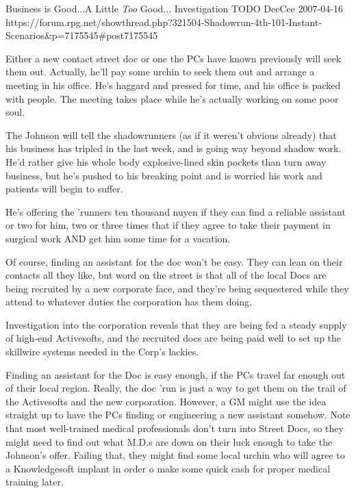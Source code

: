 \begin{scenario}{Business is Good...A Little \textit{Too} Good...}
	{Investigation}
	{TODO}
	{DeeCee}
	{2007-04-16}
	{https://forum.rpg.net/showthread.php?321504-Shadowrun-4th-101-Instant-Scenarios\&p=7175545#post7175545}

 Either a new contact street doc or one the PCs have known previously will seek them out. Actually, he'll pay some urchin to seek them out and arrange a meeting in his office. He's haggard and pressed for time, and his office is packed with people. The meeting takes place while he's actually working on some poor soul.

\synopsis The Johnson will tell the shadowrunners (as if it weren't obvious already) that his business has tripled in the last week, and is going way beyond shadow work. He'd rather give his whole body explosive-lined skin pockets than turn away business, but he's pushed to his breaking point and is worried his work and patients will begin to suffer.

He's offering the 'runners ten thousand nuyen if they can find a reliable assistant or two for him, two or three times that if they agree to take their payment in surgical work AND get him some time for a vacation.

Of course, finding an assistant for the doc won't be easy. They can lean on their contacts all they like, but word on the street is that all of the local Docs are being recruited by a new corporate face, and they're being sequestered while they attend to whatever duties the corporation has them doing.

Investigation into the corporation reveals that they are being fed a steady supply of high-end Activesofts, and the recruited docs are being paid well to set up the skillwire systems needed in the Corp's lackies.

\notes Finding an assistant for the Doc is easy enough, if the PCs travel far enough out of their local region. Really, the doc 'run is just a way to get them on the trail of the Activesofts and the new corporation. However, a GM might use the idea straight up to have the PCs finding or engineering a new assistant somehow. Note that most well-trained medical professionals don't turn into Street Docs, so they might need to find out what M.D.s are down on their luck enough to take the Johnson's offer. Failing that, they might find some local urchin who will agree to a Knowledgesoft implant in order o make some quick cash for proper medical training later. 

\end{scenario}